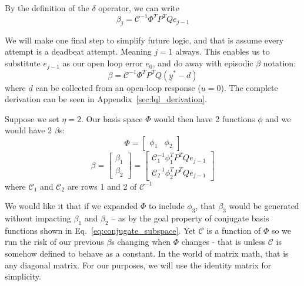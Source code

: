 By the definition of the $\delta$ operator, we can write
\begin{equation}
    \beta_j = {\mathcal{C}}^{-1}\Phi^T P^T Q e_{j-1}
    \label{eq:beta_j_with_conjunct}
\end{equation}

We will make one final step to simplify future logic, and that is assume every attempt is a deadbeat attempt. Meaning $j=1$ always. This enables us to substitute $e_{j-1}$ as our open loop error $e_0$, and do away with episodic $\beta$ notation:
\begin{equation}
    \beta = {\mathcal{C}}^{-1}\Phi^T P^T Q (\underline{y}^\ast - \underline{d})
    \label{eq:beta_j_with_conjunct_e_0}
\end{equation}
where $\underline{d}$ can be collected from an open-loop response ($\underline{u} = 0$). The complete derivation can be seen in Appendix~\ref{sec:lql_derivation}.


Suppose we set $\eta = 2$. Our basis space $\Phi$ would then have 2 functions $\phi$ and we would have 2 $\beta$s:
\begin{equation}
    \Phi = \begin{bmatrix}\phi_1 & \phi_2 \end{bmatrix}
\end{equation}
\begin{equation}
    \beta = 
    \begin{bmatrix}
        \beta_1 \\ \beta_2
    \end{bmatrix}
    =
    \begin{bmatrix}
        \mathcal{C}_1^{-1} \phi_1^T P^T Q e_{j-1} \\
        \mathcal{C}_2^{-1}\phi_2^T P^T Q e_{j-1}
    \end{bmatrix}
\end{equation}
where $\mathcal{C}_1$ and $\mathcal{C}_2$ are rows 1 and 2 of $\mathcal{C}^{-1}$

We would like it that if we expanded $\Phi$ to include $\phi_3$, that $\beta_3$ would be generated without impacting $\beta_1$ and $\beta_2$ -- as by the goal property of conjugate basis functions shown in Eq.~\ref{eq:conjugate_subspace}. Yet $\mathcal{C}$ is a function of $\Phi$ so we run the risk of our previous $\beta$s changing when $\Phi$ changes - that is unless $\mathcal{C}$ is somehow defined to behave as a constant. In the world of matrix math, that is any diagonal matrix. For our purposes, we will use the identity matrix for simplicity.

